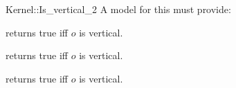 \begin{ccRefFunctionObjectConcept}{Kernel::Is_vertical_2}
A model for this must provide:


{returns true iff $o$ is vertical.}

{returns true iff $o$ is vertical.}

{returns true iff $o$ is vertical.}

\end{ccRefFunctionObjectConcept}

